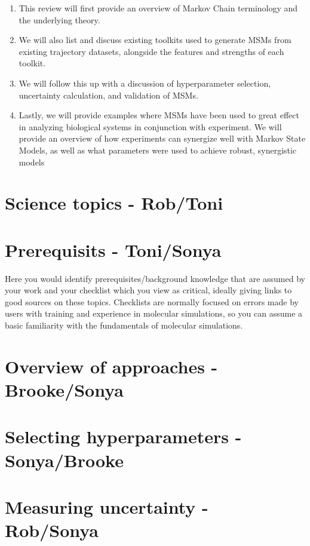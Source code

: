 \documentclass[9pt,bestpractices]{livecoms}
\begin{document}
\begin{enumerate}
    \item This review will first provide an overview of Markov Chain terminology and the underlying theory. 
    \item We will also list and discuss existing toolkits used to generate MSMs from existing trajectory datasets, alongside the features and strengths of each toolkit.
    \item We will follow this up with a discussion of hyperparameter selection, uncertainty calculation, and validation of MSMs.
    \item Lastly, we will provide examples where MSMs have been used to great effect in analyzing biological systems in conjunction with experiment. We will provide an overview of how experiments can synergize well with Markov State Models, as well as what parameters were used to achieve robust, synergistic models
\end{enumerate}



\section{Science topics - Rob/Toni}


\section{Prerequisits - Toni/Sonya}

Here you would identify prerequisites/background knowledge that are assumed by your work and your checklist which you view as critical, ideally giving links to good sources on these topics.
Checklists are normally focused on errors made by users with training and experience in molecular simulations, so you can assume a basic familiarity with the fundamentals of molecular simulations.

\section{Overview of approaches - Brooke/Sonya}


\section{Selecting hyperparameters - Sonya/Brooke}

\section{Measuring uncertainty  - Rob/Sonya}
\end{document}
